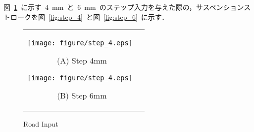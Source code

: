 \documentclass[a4paper,12pt]{article_vdlab_sotsuron}
\begin{document}
\newpage
図~\ref{fig:step46}~に示す~4~mm~と~6~mm~のステップ入力を与えた際の，サスペンションストロークを図~\ref{fig:step_4}~と図~\ref{fig:step_6}~に示す．

\vspace{10mm}
\begin{figure}[h]
    \begin{tabular}{cc}
      \begin{minipage}{0.45\hsize}
	\begin{center}
	  \texttt{[image: figure/step\_4.eps]}
	  \end{center}
	  \begin{center}
	  \vspace{-2mm}
	  \ (A) Step 4mm
	  \end{center}
	\end{minipage}
       \begin{minipage}{0.5\hsize}
	\begin{center}
	  \texttt{[image: figure/step\_4.eps]}
	  \end{center}
	  \begin{center}
	  \vspace{-2mm}
	  \ (B) Step 6mm
	  \end{center}
	   \end{minipage}
           \end{tabular}
	\label{fig:step46}
      \begin{center}
      \vspace{-2mm}
      \caption{Road Input}
    \end{center}
\end{figure}
\end{document}
